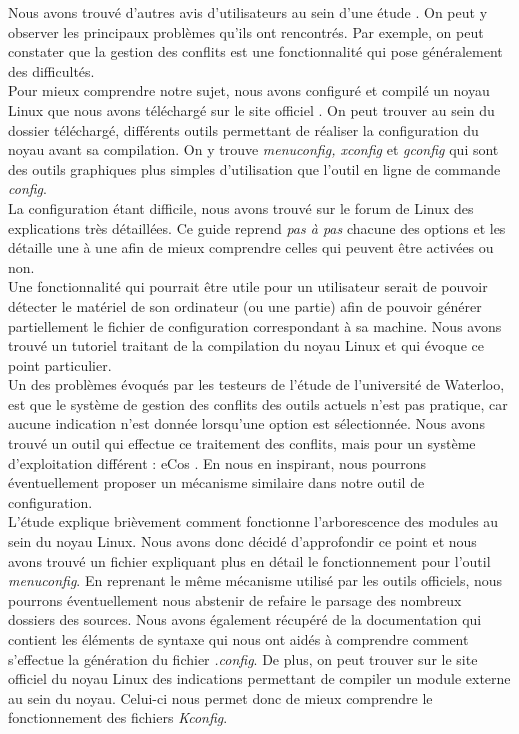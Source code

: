 ﻿\documentclass[17pts]{report}
\begin{document}
Nous avons trouvé d'autres avis d'utilisateurs au sein d'une étude
\cite{Hubaux:2012:USC:2110147.2110164}. On peut y observer les principaux
problèmes qu'ils ont rencontrés. Par exemple, on peut constater que la gestion
des conflits est une fonctionnalité qui pose généralement des difficultés.  \\

Pour mieux comprendre notre sujet, nous avons configuré et compilé un noyau
Linux que nous avons téléchargé sur le site officiel \cite{Kernel}. On peut
trouver au sein du dossier téléchargé, différents outils permettant de réaliser
la configuration du noyau avant sa compilation. On y trouve \textit{menuconfig,
xconfig} et \textit{gconfig} qui sont des outils graphiques plus simples
d'utilisation que l'outil en ligne de commande \textit{config}.  \\

La configuration étant difficile, nous avons trouvé sur le forum de Linux
\cite{Existant:Kernel:ForumTutoConfig} des explications très détaillées. Ce
guide reprend \textit{pas à pas} chacune des options et les détaille une à une
afin de mieux comprendre celles qui peuvent être activées ou non.  \\

Une fonctionnalité qui pourrait être utile pour un utilisateur serait de
pouvoir détecter le matériel de son ordinateur (ou une partie) afin de pouvoir
générer partiellement le fichier de configuration correspondant à sa machine.
Nous avons trouvé un tutoriel \cite{Existant:Kernel:outils} traitant de la
compilation du noyau Linux et qui évoque ce point particulier.  \\

Un des problèmes évoqués par les testeurs de l'étude \cite{Waterloo:Etude} de
l'université de Waterloo, est que le système de gestion des conflits des outils
actuels n'est pas pratique, car aucune indication n'est donnée lorsqu'une
option est sélectionnée. Nous avons trouvé un outil qui effectue ce traitement
des conflits, mais pour un système d'exploitation différent : eCos
\cite{Existant:EcosConfig}. En nous en inspirant, nous pourrons éventuellement
proposer un mécanisme similaire dans notre outil de configuration.  \\

L'étude \cite{Waterloo:Etude} explique brièvement comment fonctionne
l'arborescence des modules au sein du noyau Linux. Nous avons donc décidé
d'approfondir ce point et nous avons trouvé un fichier
\cite{Existant:Kconfig:frontends} expliquant plus en détail le fonctionnement
pour l'outil \textit{menuconfig}. En reprenant le même mécanisme utilisé par
les outils officiels, nous pourrons éventuellement nous abstenir de refaire le
parsage des nombreux dossiers des sources. Nous avons également récupéré de la
documentation \cite{Existant:Kconfig:vueDensemble}
\cite{Existant:Kconfig:langage} qui contient les éléments de syntaxe qui nous
ont aidés à comprendre comment s'effectue la génération du fichier
\textit{.config}.  De plus, on peut trouver sur le site officiel du noyau Linux
des indications \cite{Existant:Kconfig:modules} permettant de compiler un
module externe au sein du noyau. Celui-ci nous permet donc de mieux comprendre
le fonctionnement des fichiers \textit{Kconfig}.
\end{document}
